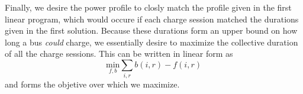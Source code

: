 \par Finally, we desire the power profile to closly match the profile given in the first linear program, which would occure if each charge session matched the durations given in the first solution.  Because these durations form an upper bound on how long a bus {\it could} charge, we essentially desire to maximize the collective duration of all the charge sessions.  This can be written in linear form as
\begin{equation}
	\underset{f,b}{\text{min}} \sum_{i,r}b(i,r) - f(i,r)
\end{equation}
and forms the objetive over which we maximize.
\begin{comment}
\par We desire to solve this second optimization method in a greedy fashion using a heuristic approach. Let $\mathcal{B}$ be the set of all charge sessions which are sorted according to their {\it latest} start time.  Begin by removing the first, or earliest, $n_{\text{charger}}$ sessions and placing them in separate queues for a charger. For the remainder of the charge sessions, we remove the next item from the list, determine which chargers are available to service this request by checking that the previous service can finish before the next will start, and then select the charger which yields the smallest amount of overlap in session availability.
\begin{algorithm}[!ht]
\DontPrintSemicolon
\KwIn{Sorted List of Charge Sessions}
\KwOut{Charge Schedule for Each Charger}
\For{i = 1:$n_{\text{charger}}$}
{
	charger[i].append(inputList.pop())
}
\While{inputList not empty}
{
	item = inputList.pop()\;
	\For{i = 1:$n_{\text{charger}}$}
	{
		bestOverlap = inf\;
		bestCharger = -1\;
		\If{charger $i$ is available}		
		{
			\If{overlap is less than bestOverlap}
			{
				bestOverlap = itemOverlap\;
				bestCharger = i\;
			}
		}
	}
	charger[bestCharger].append(item)\;
}
\caption{Pseudocode that illustrates how charge sessions are assigned}
\label{alg:chargeAssign}
\end{algorithm}
\end{comment}
